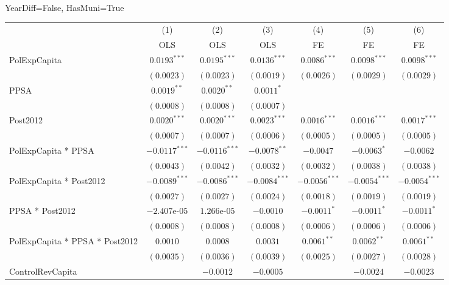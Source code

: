 \documentclass[border=10pt,varwidth=25cm]{standalone}
\renewenvironment{table}[1][]{}{}
\begin{document}
\begin{table}[H]
    \centering
    \scriptsize
    \begin{minipage}{\textwidth}
    \centering
    {\normalsize YearDiff=False, HasMuni=True}
    \vspace{6pt}
    \begin{tabular}{lcccccc}
        \toprule
         & (1) & (2) & (3) & (4) & (5) & (6) \\
         & OLS & OLS & OLS & FE & FE & FE \\
        \midrule
        PolExpCapita & $0.0193^{***}$ & $0.0195^{***}$ & $0.0136^{***}$ & $0.0086^{***}$ & $0.0098^{***}$ & $0.0098^{***}$ \\
         & $(0.0023)$ & $(0.0023)$ & $(0.0019)$ & $(0.0026)$ & $(0.0029)$ & $(0.0029)$ \\[4pt]
        PPSA & $0.0019^{**}$ & $0.0020^{**}$ & $0.0011^{*}$ &  &  &  \\
         & $(0.0008)$ & $(0.0008)$ & $(0.0007)$ &  &  &  \\[4pt]
        Post2012 & $0.0020^{***}$ & $0.0020^{***}$ & $0.0023^{***}$ & $0.0016^{***}$ & $0.0016^{***}$ & $0.0017^{***}$ \\
         & $(0.0007)$ & $(0.0007)$ & $(0.0006)$ & $(0.0005)$ & $(0.0005)$ & $(0.0005)$ \\[4pt]
        PolExpCapita * PPSA & $-0.0117^{***}$ & $-0.0116^{***}$ & $-0.0078^{**}$ & $-0.0047$ & $-0.0063^{*}$ & $-0.0062$ \\
         & $(0.0043)$ & $(0.0042)$ & $(0.0032)$ & $(0.0032)$ & $(0.0038)$ & $(0.0038)$ \\[4pt]
        PolExpCapita * Post2012 & $-0.0089^{***}$ & $-0.0086^{***}$ & $-0.0084^{***}$ & $-0.0056^{***}$ & $-0.0054^{***}$ & $-0.0054^{***}$ \\
         & $(0.0027)$ & $(0.0027)$ & $(0.0024)$ & $(0.0018)$ & $(0.0019)$ & $(0.0019)$ \\[4pt]
        PPSA * Post2012 & $-2.407\text{e-}05$ & $1.266\text{e-}05$ & $-0.0010$ & $-0.0011^{*}$ & $-0.0011^{*}$ & $-0.0011^{*}$ \\
         & $(0.0008)$ & $(0.0008)$ & $(0.0008)$ & $(0.0006)$ & $(0.0006)$ & $(0.0006)$ \\[4pt]
        PolExpCapita * PPSA * Post2012 & $0.0010$ & $0.0008$ & $0.0031$ & $0.0061^{**}$ & $0.0062^{**}$ & $0.0061^{**}$ \\
         & $(0.0035)$ & $(0.0036)$ & $(0.0039)$ & $(0.0025)$ & $(0.0027)$ & $(0.0028)$ \\[4pt]
        ControlRevCapita &  & $-0.0012$ & $-0.0005$ &  & $-0.0024$ & $-0.0023$ \\

\end{tabular}
\end{minipage}
\end{table}
\end{document}
